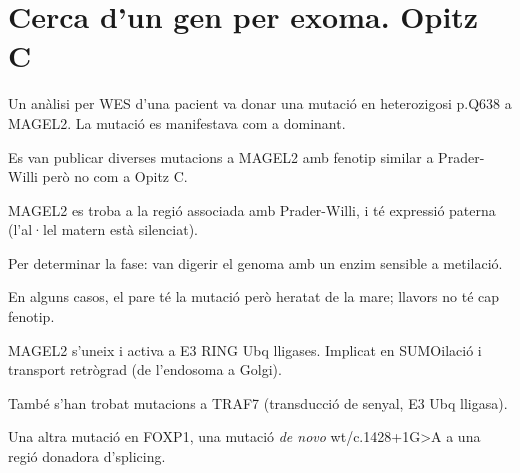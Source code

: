 \section{Cerca d'un gen per exoma. Opitz C}
\label{sec:cerca-dun-gen}

Un anàlisi per WES d'una pacient va donar una mutació en heterozigosi p.Q638 a MAGEL2. La mutació es manifestava com a dominant.

Es van publicar diverses mutacions a MAGEL2 amb fenotip similar a Prader-Willi però no com a Opitz C.

MAGEL2 es troba a la regió associada amb Prader-Willi, i té expressió paterna (l'al·lel matern està silenciat).

Per determinar la fase: van digerir el genoma amb un enzim sensible a metilació.

En alguns casos, el pare té la mutació però heratat de la mare; llavors no té cap fenotip.

MAGEL2 s'uneix i activa a E3 RING Ubq lligases. Implicat en SUMOilació i transport retrògrad (de l'endosoma a Golgi).

També s'han trobat mutacions a TRAF7 (transducció de senyal, E3 Ubq lligasa).

Una altra mutació en FOXP1, una mutació \textit{de novo} wt/c.1428+1G>A a una regió donadora d'splicing.